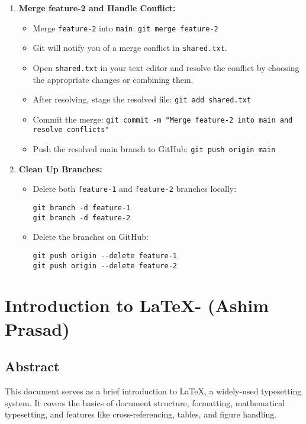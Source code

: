 \documentclass[a4paper,15pt]{article}
\begin{document}
\begin{enumerate}[label=\arabic*.]
    \item \textbf{Merge feature-2 and Handle Conflict:}
    \begin{itemize}
        \item Merge \texttt{feature-2} into \texttt{main}: \texttt{git merge feature-2}
        \item Git will notify you of a merge conflict in \texttt{shared.txt}.
        \item Open \texttt{shared.txt} in your text editor and resolve the conflict by choosing the appropriate changes or combining them.
        \item After resolving, stage the resolved file: \texttt{git add shared.txt}
        \item Commit the merge: \texttt{git commit -m "Merge feature-2 into main and resolve conflicts"}
        \item Push the resolved main branch to GitHub: \texttt{git push origin main}
    \end{itemize}

    \item \textbf{Clean Up Branches:}
    \begin{itemize}
        \item Delete both \texttt{feature-1} and \texttt{feature-2} branches locally:
        \begin{verbatim}
git branch -d feature-1
git branch -d feature-2
        \end{verbatim}
        \item Delete the branches on GitHub:
        \begin{verbatim}
git push origin --delete feature-1
git push origin --delete feature-2
        \end{verbatim}
    \end{itemize}
\end{enumerate}
\newpage
\section{ Introduction to \LaTeX - (Ashim Prasad)}

\subsection{Abstract}
This document serves as a brief introduction to \LaTeX, a widely-used typesetting system. 
    It covers the basics of document structure, formatting, mathematical typesetting, and features 
    like cross-referencing, tables, and figure handling.
\end{document}
